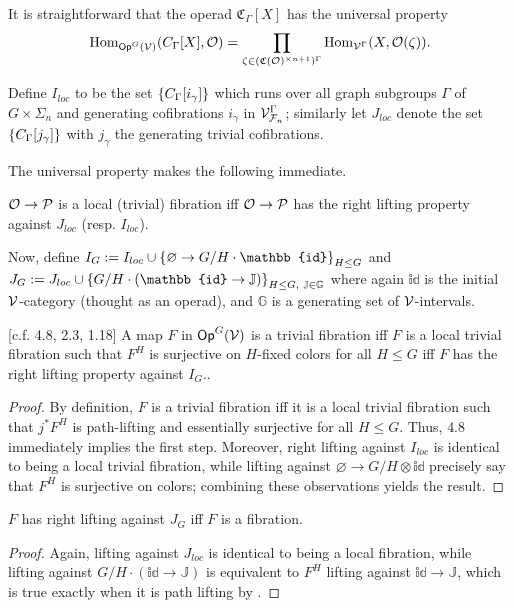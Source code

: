 \documentclass[psamsfonts,onesided,10pt,letterpaper]{amsart}%
\renewcommand{\F}{\mathcal F}
\newcommand{\J}{\ensuremath{\mathbb{J}}}
\renewcommand{\1}{\ensuremath{\mathbb{id}}}
\renewcommand{\P}{\ensuremath{\mathcal{P}}}
\begin{document}
It is straightforward that the operad $\mathfrak C_\Gamma[X]$ has the universal property
\begin{equation}
      \operatorname{Hom}_{\mathsf{Op}^G(\mathcal V)}(C_\Gamma[X], \mathcal{O}) = \mathop\prod\limits_{\zeta \in (\mathfrak C(\mathcal{O})^{\times n+1})^\Gamma}\operatorname{Hom}_{\mathcal V^\Gamma}(X, \mathcal{O}(\zeta)).
\end{equation}

Define $I_{loc}$ to be the set $\left\{C_{\Gamma}[i_\gamma]\right\}$ which runs over all
graph subgroups $\Gamma$ of $G \times \Sigma_n$ and
generating cofibrations $i_\gamma$ in $\V^\Gamma_{\F_n}$;
similarly let $J_{loc}$ denote the set $\left\{C_{\Gamma}[j_\gamma]\right\}$
with $j_\gamma$ the generating trivial cofibrations.

The universal property makes the following immediate.
\begin{corollary}
  $\O\to \P$ is a local (trivial) fibration {\sc iff} $\O\to \P$ has the right lifting property against $J_{loc}$ (resp. $I_{loc}$).
\end{corollary}

Now, define $I_{G}:= I_{loc} \mathbin{\cup} \set{\varnothing \to G/H \cdot \1}_{H\leq G}$
and
$J_{G} := J_{loc} \mathbin{\cup} \set{G/H \cdot (\1 \to \J)}_{H\leq G,\ \J\in\mathbb{G}}$
where again $\1$ is the initial $\mathcal V$-category (thought as an operad), and $\mathbb{G}$ is a generating set of $\mathcal V$-intervals. 

\begin{lemma}
  \label{CAV_4.8}
  [c.f. \cite{Cav14} 4.8, \cite{BM13} 2.3, \cite{CM13b} 1.18]
  A map $F$ in $\mathsf{Op}^G(\mathcal V)$ is a trivial fibration {\sc iff} $F$ is a local trivial fibration such that $F^H$ is surjective on $H$-fixed colors for all $H\leq G$ {\sc iff} $F$ has the right lifting property against $I_{G}$.. 
\end{lemma}
\begin{proof}
      By definition, $F$ is a trivial fibration {\sc iff}
      it is a local trivial fibration such that $j^*F^H$ is path-lifting and essentially surjective for all $H\leq G$.
      Thus, \cite{Cav14} 4.8 immediately implies the first step.
      Moreover, right lifting against $I_{loc}$ is identical to being a local trivial fibration, while
      lifting against $\varnothing \to G/H\otimes \1$ precisely say that $F^H$ is surjective on colors;
      combining these observations yields the result.
\end{proof}

\begin{lemma}
  $F$ has right lifting against $J_{G}$ {\sc iff} $F$ is a fibration.
\end{lemma}
\begin{proof}
      Again, lifting against $J_{loc}$ is identical to being a local fibration, while lifting against $G/H \cdot (\1 \to \J)$
      is equivalent to $F^H$ lifting against $\1 \to \J$, which is true exactly when it is path lifting by \cite{Cav14}. 
\end{proof}
\end{document}
